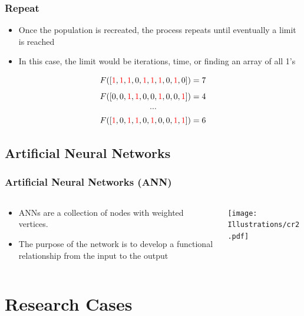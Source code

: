 \documentclass{beamer}
\begin{document}
\begin{frame}
  \frametitle{Repeat}
\begin{itemize}
  \item Once the population is recreated, the process repeats until eventually a limit is reached
  \item In this case, the limit would be iterations, time, or finding an array of all 1's
\end{itemize}
\[
F([ \textcolor{red}{1},  \textcolor{red}{1}, \textcolor{red}{1}, 0, \textcolor{red}{1}, \textcolor{red}{1}, \textcolor{red}{1}, 0, \textcolor{red}{1}, 0 ]) = 7
\]
\[F([  0, 0, \textcolor{red}{1}, \textcolor{red}{1}, 0,  0, \textcolor{red}{1}, 0, 0, \textcolor{red}{1} ]) = 4
\]
\[\cdots\]
\[F([  \textcolor{red}{1}, 0, \textcolor{red}{1}, \textcolor{red}{1}, 0,  \textcolor{red}{1}, 0, 0, \textcolor{red}{1}, \textcolor{red}{1} ]) = 6
\]
\end{frame}

\subsection{Artificial Neural Networks}
\begin{frame}
  \frametitle{Artificial Neural Networks (ANN)}
\begin{columns}
  \begin{column}{0.5\textwidth}
\begin{itemize}
\item  ANNs are a collection of nodes with weighted vertices.
\item The purpose of the network is to develop a functional relationship from the input to the output
\end{itemize}
\end{column}
\begin{column}{0.5\textwidth}
 \texttt{[image: Illustrations/cr2.pdf]}
       \\
\end{column}
\end{columns}
\end{frame}

\section{Research Cases}
\end{document}
